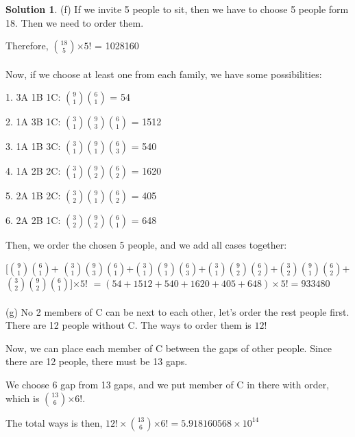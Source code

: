 \documentclass{article}
\theoremstyle{definition}
\newtheorem*{solution}{Solution}
\begin{document}
\begin{solution}
(f) If we invite 5 people to sit, then we have to choose 5 people form 18. Then we need to order them.

Therefore, \(18\choose5\)\(\times 5!\) = 1028160\\\\

Now, if we choose at least one from each family, we have some possibilities:

1. 3A 1B 1C: \(9\choose1\)\(6\choose1\) = 54

2. 1A 3B 1C: \(3\choose1\)\(9\choose3\)\(6\choose1\) = 1512

3. 1A 1B 3C: \(3\choose1\)\(9\choose1\)\(6\choose3\) = 540

4. 1A 2B 2C: \(3\choose1\)\(9\choose2\)\(6\choose2\) = 1620

5. 2A 1B 2C: \(3\choose2\)\(9\choose1\)\(6\choose2\) = 405

6. 2A 2B 1C: \(3\choose2\)\(9\choose2\)\(6\choose1\) = 648

Then, we order the chosen 5 people, and we add all cases together:

[\(9\choose1\)\(6\choose1\)+ \(3\choose1\)\(9\choose3\)\(6\choose1\)+\(3\choose1\)\(9\choose1\)\(6\choose3\)+\(3\choose1\)\(9\choose2\)\(6\choose2\)+\(3\choose2\)\(9\choose1\)\(6\choose2\)+\(3\choose2\)\(9\choose2\)\(6\choose1\)]\(\times 5!\) \(= (54+1512+540+1620+405+648)\times 5! = 933480\)\\\\


(g) No 2 members of C can be next to each other, let's order the rest people first. There are 12 people without C. The ways to order them is \(12!\)

Now, we can place each member of C between the gaps of other people. Since there are 12 people, there must be 13 gaps.

We choose 6 gap from 13 gaps, and we put member of C in there with order, which is \(13\choose6\)\(\times 6!\).

The total ways is then, \(12! \times\)\(13\choose6\)\(\times 6! = 5.918160568\times 10^{14}\)\\\\\\

\end{solution}
\end{document}
